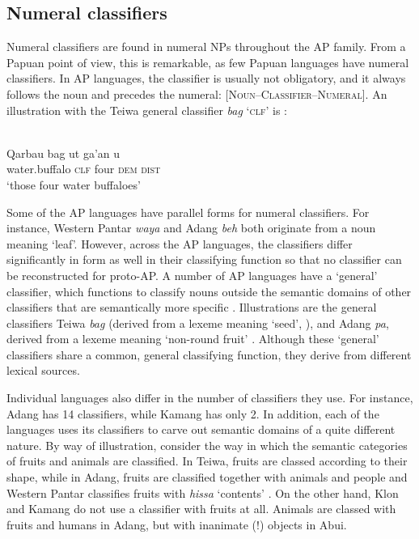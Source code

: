 \subsection{Numeral classifiers}\label{sec:1:6.3}
Numeral classifiers are found in numeral NPs throughout the AP family. From a Papuan point of view, this is remarkable, as few Papuan languages have numeral classifiers. In AP languages, the classifier is usually not obligatory, and it always follows the noun and precedes the numeral: \textsc{[Noun--Classifier--Numeral]}. An illustration with the Teiwa general classifier \textit{bag} `\textsc{clf}' is :



\ea%
\label{ex:1:35}
 \\
\gll Qarbau   bag   ut   ga'an   u \\
 water.buffalo  \textsc{clf}  four  \textsc{dem}  \textsc{dist}  \\
\glt `those four water buffaloes'   
\z 



         

Some of the AP languages have parallel forms for numeral classifiers. For instance, Western Pantar \textit{waya} and Adang \textit{beh} both originate from a noun meaning `leaf'. However, across the AP languages, the classifiers differ significantly in form as well in their classifying function so that no classifier can be reconstructed for proto-AP. A number of AP languages have a `general' classifier, which functions to classify nouns outside the semantic domains of other classifiers that are semantically more specific \citep[cf.][]{ZubinEtAl1993}. Illustrations are the general classifiers Teiwa \textit{bag} (derived from a lexeme meaning `seed', \citealt{Klamer2014history,Klamertanumeral}), and Adang \textit{pa{\textglotstop}}, derived from a lexeme meaning `non-round fruit' \citep{RobinsonEtAltaadang}. Although these `general' classifiers share a common, general classifying function, they derive from different lexical sources.

Individual languages also differ in the number of classifiers they use. For instance, Adang has 14 classifiers, while Kamang has only 2.  In addition, each of the languages uses its classifiers to carve out semantic domains of a quite different nature. By way of illustration, consider the way in which the semantic categories of fruits and animals are classified. In Teiwa, fruits are classed according to their shape, while in Adang, fruits are classified together with animals and people \citep{RobinsonEtAltaadang} and Western Pantar classifies fruits with \textit{hissa} `contents' \citep{Holtontanumeral}. On the other hand, Klon \citep{Baird2008} and Kamang \citep{Schapperta} do not use a classifier with fruits at all. Animals are classed with fruits and humans in Adang, but with inanimate (!) objects in Abui. 


